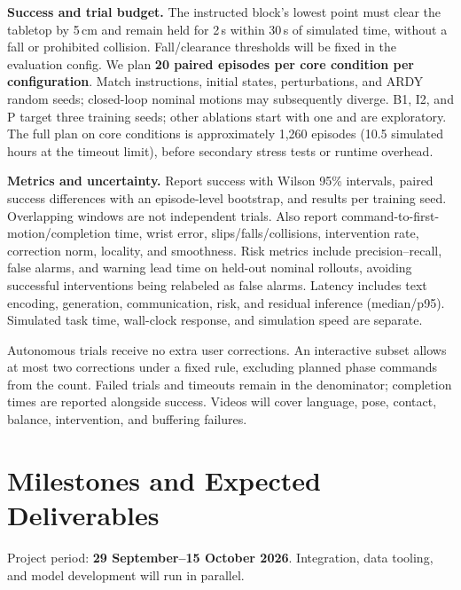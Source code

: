 \documentclass[11pt,a4paper]{article}
\begin{document}
\textbf{Success and trial budget.}
The instructed block's lowest point must clear the tabletop by 5\,cm and remain
held for 2\,s within 30\,s of simulated time, without a fall or prohibited
collision. Fall/clearance thresholds will be fixed in the evaluation config.
We plan \textbf{20 paired episodes per core condition per configuration}.
Match instructions, initial states, perturbations, and ARDY random seeds;
closed-loop nominal motions may subsequently diverge. B1, I2, and P target
three training seeds; other ablations start with one and are exploratory.
The full plan on core conditions is approximately 1,260 episodes (10.5 simulated
hours at the timeout limit), before secondary stress tests or runtime overhead.

\textbf{Metrics and uncertainty.}
Report success with Wilson 95\% intervals, paired success differences with
an episode-level bootstrap, and results per training seed. Overlapping windows
are not independent trials. Also report command-to-first-motion/completion
time, wrist error, slips/falls/collisions, intervention rate, correction norm,
locality, and smoothness. Risk metrics include precision--recall, false alarms,
and warning lead time on held-out nominal rollouts, avoiding successful
interventions being relabeled as false alarms. Latency includes text encoding,
generation, communication, risk, and residual inference (median/p95).
Simulated task time, wall-clock response, and simulation speed are separate.

Autonomous trials receive no extra user corrections. An interactive subset
allows at most two corrections under a fixed rule, excluding planned phase
commands from the count. Failed trials and timeouts remain in the denominator;
completion times are reported alongside success. Videos will cover language,
pose, contact, balance, intervention, and buffering failures.

\section{Milestones and Expected Deliverables}
Project period: \textbf{29 September--15 October 2026}.
Integration, data tooling, and model development will run in parallel.
\end{document}
